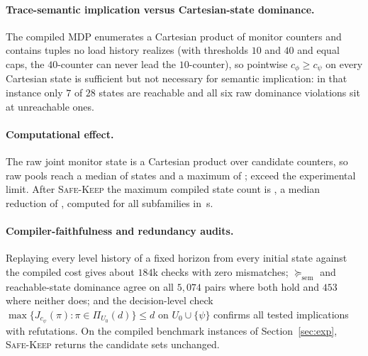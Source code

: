 \paragraph{Trace-semantic implication versus Cartesian-state dominance.} The compiled MDP
enumerates a Cartesian product of monitor counters and contains tuples no load history realizes
(with thresholds \(10\) and \(40\) and equal caps, the \(40\)-counter can never lead the
\(10\)-counter), so pointwise \(c_\phi\ge c_\psi\) on every Cartesian state is sufficient but not
necessary for semantic implication: in that instance only \(7\) of \(28\) states are reachable
and all six raw dominance violations sit at unreachable ones.

\paragraph{Computational effect.} The raw joint monitor state is a Cartesian product
over candidate counters, so raw pools reach a median of \RawMedianStates{} states and
a maximum of \MaxRawStates{}; \RawCompileFailurePct{} exceed the experimental limit.
After \textsc{Safe-Keep} the maximum compiled state count is \MaxSafeKeepStates{},
a median reduction of \MedianStateReduction{}, computed for all \SkSubfamilies{}
subfamilies in \SkRuntime{}\,s.

\paragraph{Compiler-faithfulness and redundancy audits.} Replaying every level history of
a fixed horizon from every initial state against the compiled cost gives about \(184\)k
checks with zero mismatches; \(\succeq_{\mathrm{sem}}\) and reachable-state dominance agree
on all \(5{,}074\) pairs where both hold and \(453\) where neither does; and the
decision-level check \(\max\{J_{c_\psi}(\pi):\pi\in\Pi_{U_0}(d)\}\le d\) on
\(U_0\cup\{\psi\}\) confirms all \SkLPConfirmed{} tested implications with \SkLPRefuted{}
refutations. On the \BenchmarkUnchanged{} compiled benchmark instances of
Section~\ref{sec:exp}, \textsc{Safe-Keep} returns the candidate sets unchanged.

